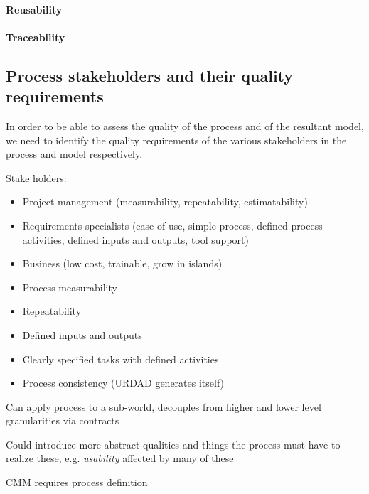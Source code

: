 \paragraph{Reusability}

\paragraph{Traceability}


\subsection{Process stakeholders and their quality requirements}

In order to be able to assess the quality of the process and of the resultant model, we need to identify the quality requirements of the various stakeholders in the process and model respectively.


\cite{berard_what_1995}

Stake holders:
\begin{itemize}
  \item Project management (measurability, repeatability, estimatability)
  \item Requirements specialists (ease of use, simple process, defined process activities, defined inputs and outputs, tool support)
  \item Business (low cost, trainable, grow in islands)
\end{itemize}


\begin{itemize}
  \item Process measurability
  \item Repeatability
  \item Defined inputs and outputs
  \item Clearly specified tasks with defined activities
  \item Process consistency (URDAD generates itself)
\end{itemize}

Can apply process to a sub-world, decouples from higher and lower level granularities via contracts

Could introduce more abstract qualities and things the process must have to realize these, e.g. \emph{usability} affected by many of these

CMM requires process definition


